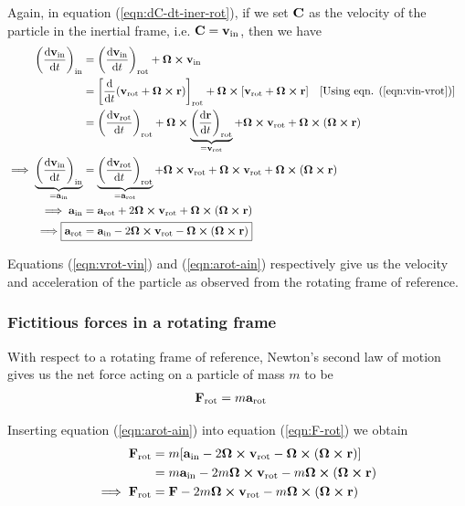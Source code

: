 			Again, in equation (\ref{eqn:dC-dt-iner-rot}), if we set $\vb{C}$ as the velocity of the particle in the inertial frame, i.e. $\vb{C}=\vb{v}_\text{in}$, then we have
			\begin{align}
				\qty(\dv{\vb{v}_\text{in}}{t})_\text{in}&=\qty(\dv{\vb{v}_\text{in}}{t})_\text{rot}+\vb{\Omega}\cross\vb{v}_\text{in} \nonumber\\
					&=\qty[\dv{t}\qty(\vb{v}_\text{rot}+\vb{\Omega}\cross\vb{r})]_\text{rot}+\vb{\Omega}\cross\qty[\vb{v}_\text{rot}+\vb{\Omega}\cross\vb{r}] \qq{[Using eqn. (\ref{eqn:vin-vrot})]} \nonumber\\
					&=\qty(\dv{\vb{v}_\text{rot}}{t})_\text{rot}+\vb{\Omega}\cross\underbrace{\qty(\dv{\vb{r}}{t})_\text{rot}}_{=\vb{v}_\text{rot}}+\vb{\Omega}\cross\vb{v}_\text{rot}+\vb{\Omega}\cross\qty(\vb{\Omega}\cross\vb{r}) \nonumber\\
				\implies\underbrace{\qty(\dv{\vb{v}_\text{in}}{t})_\text{in}}_{=\vb{a}_\text{in}}&=\underbrace{\qty(\dv{\vb{v}_\text{rot}}{t})_\text{rot}}_{=\vb{a}_\text{rot}}+\vb{\Omega}\cross\vb{v}_\text{rot}+\vb{\Omega}\cross\vb{v}_\text{rot}+\vb{\Omega}\cross\qty(\vb{\Omega}\cross\vb{r}) \nonumber\\
				\implies\vb{a}_\text{in}&=\vb{a}_\text{rot}+2\vb{\Omega}\cross\vb{v}_\text{rot}+\vb{\Omega}\cross\qty(\vb{\Omega}\cross\vb{r}) \nonumber\\
				\implies\Aboxed{\vb{a}_\text{rot}&=\vb{a}_\text{in}-2\vb{\Omega}\cross\vb{v}_\text{rot}-\vb{\Omega}\cross\qty(\vb{\Omega}\cross\vb{r})} \label{eqn:arot-ain}
			\end{align}
			
			Equations (\ref{eqn:vrot-vin}) and (\ref{eqn:arot-ain}) respectively give us the velocity and acceleration of the particle as observed from the rotating frame of reference.
			
		\subsubsection{Fictitious forces in a rotating frame}
			With respect to a rotating frame of reference, Newton's second law of motion gives us the net force acting on a particle of mass $m$ to be
			\begin{align}
				\vb{F}_\text{rot}&=m\vb{a}_\text{rot} \label{eqn:F-rot}
			\end{align}
			
			Inserting equation (\ref{eqn:arot-ain}) into equation (\ref{eqn:F-rot}) we obtain
			\begin{align}
				\vb{F}_\text{rot}&=m\qty[\vb{a}_\text{in}-2\vb{\Omega}\cross\vb{v}_\text{rot}-\vb{\Omega}\cross\qty(\vb{\Omega}\cross\vb{r})] \nonumber\\
					&=m\vb{a}_\text{in}-2m\vb{\Omega}\cross\vb{v}_\text{rot}-m\vb{\Omega}\cross\qty(\vb{\Omega}\cross\vb{r}) \nonumber\\
				\implies\vb{F}_\text{rot}&=\vb{F}-2m\vb{\Omega}\cross\vb{v}_\text{rot}-m\vb{\Omega}\cross\qty(\vb{\Omega}\cross\vb{r}) \label{eqn:F-rot-01}
			\end{align}
			
